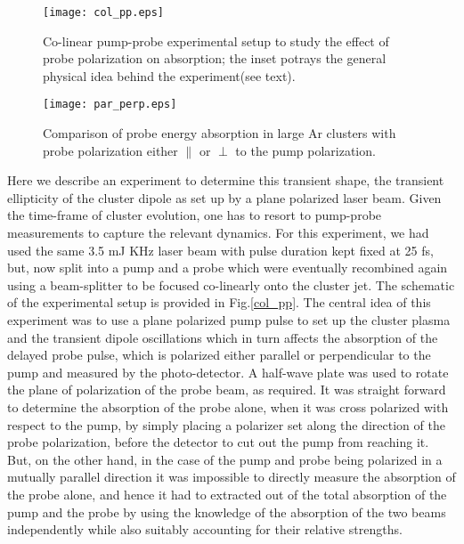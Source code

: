 \documentclass[a4paper,12pt]{article}
\begin{document}
\begin{figure}[h]
  \centering
  \begin{minipage}[!]{0.495\textwidth}
    \texttt{[image: col\_pp.eps]}
    \caption{Co-linear pump-probe experimental setup to study the effect of probe polarization on absorption; the inset potrays the general physical idea behind the experiment(see text).}
    \label{col_pp}
  \end{minipage}
  \hfill
  \begin{minipage}[!]{0.495\textwidth}
    \texttt{[image: par\_perp.eps]}
    \caption{Comparison of probe energy absorption in large Ar clusters with probe polarization either $\parallel$ or $\perp$ to the pump polarization.}
    \label{par_perp}
  \end{minipage}
\end{figure}

Here we describe an experiment to determine this transient shape, the transient ellipticity of the cluster dipole as set up by a plane polarized laser beam. Given the time-frame of cluster evolution, one has to resort to pump-probe measurements to capture the relevant dynamics. For this experiment, we had used the same 3.5 mJ KHz laser beam with pulse duration kept fixed at 25 fs, but, now split into a pump and a probe which were eventually recombined again using a beam-splitter to be focused co-linearly onto the cluster jet. The schematic of the experimental setup is provided in Fig.\ref{col_pp}. The central idea of this experiment was to use a plane polarized pump pulse to set up the cluster plasma and the transient dipole oscillations which in turn affects the absorption of the delayed probe pulse, which is polarized either parallel or perpendicular to the pump and measured by the photo-detector. A half-wave plate was used to rotate the plane of polarization of the probe beam, as required. It was straight forward to determine the absorption of the probe alone, when it was cross polarized with respect to the pump, by simply placing a polarizer set along the direction of the probe polarization, before the detector to cut out the pump from reaching it. But, on the other hand, in the case of the pump and probe being polarized in a mutually parallel direction it was impossible to directly measure the absorption of the probe alone, and hence it had to extracted out of the total absorption of the pump and the probe by using the knowledge of the absorption of the two beams independently while also suitably accounting for their relative strengths. 
\end{document}
